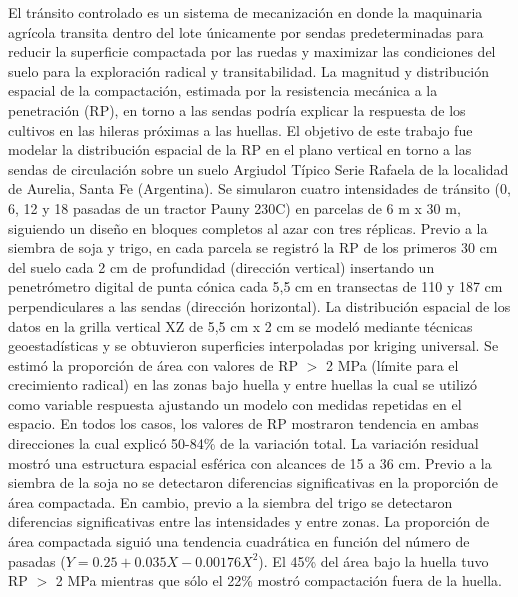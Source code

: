 {El tránsito controlado es un sistema de mecanización en donde la maquinaria agrícola transita dentro del lote únicamente por sendas predeterminadas para reducir la superficie compactada por las ruedas y maximizar las condiciones del suelo para la exploración radical y transitabilidad. La magnitud y distribución espacial de la compactación, estimada por la resistencia mecánica a la penetración (RP), en torno a las sendas podría explicar la respuesta de los cultivos en las hileras próximas a las huellas. El objetivo de este trabajo fue modelar la distribución espacial de la RP en el plano vertical en torno a las sendas de circulación sobre un suelo Argiudol Típico Serie Rafaela de la localidad de Aurelia, Santa Fe (Argentina). Se simularon cuatro intensidades de tránsito (0, 6, 12 y 18 pasadas de un tractor Pauny 230C) en parcelas de 6 m x 30 m, siguiendo un diseño en bloques completos al azar con tres réplicas. Previo a la siembra de soja y trigo, en cada parcela se registró la RP de los primeros 30 cm del suelo cada 2 cm de profundidad (dirección vertical) insertando un penetrómetro digital de punta cónica cada 5,5 cm en transectas de 110 y 187 cm perpendiculares a las sendas (dirección horizontal). La distribución espacial de los datos en la grilla vertical XZ de 5,5 cm x 2 cm se modeló mediante técnicas geoestadísticas y se obtuvieron superficies interpoladas por kriging universal. Se estimó la proporción de área con valores de RP $>$ 2 MPa (límite para el crecimiento radical) en las zonas bajo huella y entre huellas la cual se utilizó como variable respuesta ajustando un modelo con medidas repetidas en el espacio. En todos los casos, los valores de RP mostraron tendencia en ambas direcciones la cual explicó 50-84\% de la variación total. La variación residual mostró una estructura espacial esférica con alcances de 15 a 36 cm. Previo a la siembra de la soja no se detectaron diferencias significativas en la proporción de área compactada. En cambio, previo a la siembra del trigo se detectaron diferencias significativas entre las intensidades y entre zonas. La proporción de área compactada siguió una tendencia cuadrática en función del número de pasadas ($Y = 0.25 + 0.035X - 0.00176X^2$). El 45\% del área bajo la huella tuvo RP $>$ 2 MPa mientras que sólo el 22\% mostró compactación fuera de la huella.}

